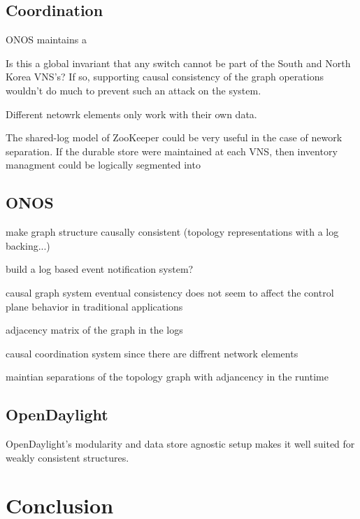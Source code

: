 \documentclass[letterpaper,twocolumn,10pt]{article}
\begin{document}
\subsection{Coordination}

ONOS maintains a 

 Is this a global invariant that any switch cannot be part of the South and North Korea VNS's? If so, supporting causal consistency of the graph operations wouldn't do much to prevent such an attack on the system. 

 Different netowrk elements only work with their own data.

 The shared-log model of ZooKeeper could be very useful in the case of nework separation. If the durable store were maintained at each VNS, then inventory managment could be logically segmented into 

\subsection{ONOS}

make graph structure causally consistent (topology representations with a log backing...)

build a log based event notification system?

causal graph system
    eventual consistency does not seem to affect the control plane behavior in traditional applications

adjacency matrix of the graph in the logs

causal coordination system since there are diffrent network elements

maintian separations of the topology graph with adjancency in the runtime
\subsection{OpenDaylight}

OpenDaylight's modularity and data store agnostic setup makes it well suited for weakly consistent structures.

\section{Conclusion}



\end{document}
